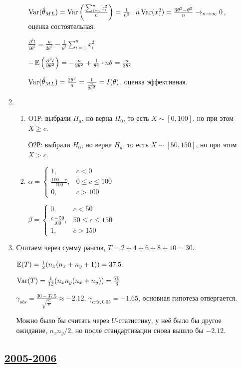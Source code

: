\begin{enumerate}[resume]
\begin{enumerate}
\begin{enumerate}
$\operatorname{Var}(\hat{\theta}_{ML}) = \operatorname{Var}\left(\frac{\sum_{i=1}^n x_i^2}{n}\right) = \frac{1}{n^2}\cdot n \operatorname{Var}(x_1^2) = \frac{3\theta^2 - \theta^2}{n}\to_{n\to\infty} 0$,
оценка состоятельная.

$\frac{\partial^2 l}{\partial \theta^2} = \frac{n}{2 \theta^2} - \frac{1}{\theta^3}\sum_{i=1}^n x_i^2$

$-\operatorname{\mathbb{E}}\left(\frac{\partial^2 l}{\partial \theta^2}\right) = -\frac{n}{2 \theta^2} + \frac{1}{\theta^3} \cdot n \theta = \frac{n}{2 \theta^2}$

$\operatorname{Var}(\hat{\theta}_{ML}) = \frac{2\theta^2}{n} = \frac{1}{\frac{n}{2 \theta^2}} = I(\theta)$,
оценка эффективная.
\end{enumerate}
\item
\begin{enumerate}
\item O1Р: выбрали $H_a$, но верна $H_0$, то есть $X \sim [0, 100]$, но при этом $X \geq c$.

О2Р: выбрали $H_0$, но верна $H_a$, то есть $X \sim [50, 150]$, но при этом $X > c$.
\item $\alpha = \begin{cases}
1, & c < 0 \\
\frac{100-c}{100}, & 0 \leq c \leq 100 \\
0, & c > 100
\end{cases}$

$\beta = \begin{cases}
0, & c < 50 \\
\frac{c-50}{100}, & 50 \leq c \leq 150 \\
1, & c > 150
\end{cases}$
\end{enumerate}
\item Считаем через сумму рангов, $T = 2 + 4 + 6 + 8 + 10 = 30$.

$\operatorname{\mathbb{E}}(T) = \frac{1}{2}(n_x(n_x+n_y+1)) = 37.5$.

$\operatorname{Var}(T) = \frac{1}{12}(n_x n_y(n_x + n_y)) = \frac{75}{6}$

$\gamma_{obs} = \frac{30-37.5}{\sqrt{\frac{75}{6}}} \approx -2.12$,
$\gamma_{crit, 0.05} = -1.65$, основная гипотеза отвергается.

Можно было бы считать через $U$-статистику, у неё было бы другое ожидание, $n_x n_y/2$,
но после стандартизации снова вышло бы $-2.12$.

\end{enumerate}


\subsection[2005-2006]{\hyperref[sec:kr_03_2005_2006]{2005-2006}}
\label{sec:sol_kr_03_2005_2006}


\end{enumerate}
